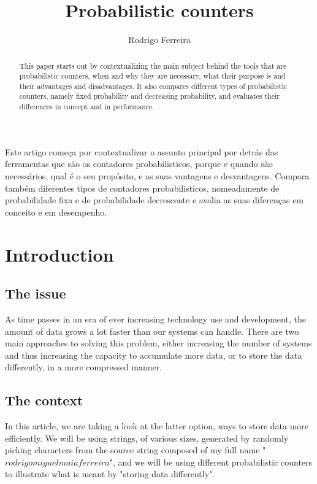 \documentclass[...]{revdetua}
\begin{document}

\title{Probabilistic counters}
\author{Rodrigo Ferreira} %
\maketitle

\begin{resumo}%
	Este artigo começa por contextualizar o assunto principal por detrás das ferramentas que são os contadores probabilisticos, porque e quando são necessários, qual é o seu propósito, e as suas vantagens e desvantagens.
Compara também diferentes tipos de contadores probabilisticos, nomeadamente de probabilidade fixa e de probabilidade decrescente e avalia as suas diferenças em conceito e em desempenho.
\end{resumo}

\begin{abstract}%
  This paper starts out by contextualizing the main subject behind the tools that are probabilistic counters, when and why they are necessary, what their purpose is and their advantages and disadvantages.
  It also compares different types of probabilistic counters, namely fixed probability and decreasing probability, and evaluates their differences in concept and in performance.
\end{abstract}
\section{Introduction}
\subsection{The issue}
As time passes in an era of ever increasing technology use and development, the amount of data grows a lot faster than our systems can handle.
There are two main approaches to solving this problem, either increasing the number of systems and thus increasing the capacity to accumulate more data, or to store the data differently, in a more compressed manner.
\subsection{The context}
In this article, we are taking a look at the latter option, ways to store data more efficiently.
We will be using strings, of various sizes, generated by randomly picking characters from the source string composed of my full name "$rodrigomiguelmaiaferreira$", and we will be using different probabilistic counters to illustrate what is meant by "storing data differently". 
\end{document}
